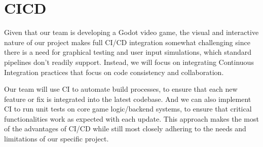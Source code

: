 \documentclass{article}
\begin{document}




\section{CICD}

Given that our team is developing a Godot video game, the visual and interactive nature of our project makes full CI/CD integration somewhat challenging since there is a need for graphical testing and user input simulations, which standard pipelines don’t readily support. Instead, we will focus on integrating Continuous Integration practices that focus on code consistency and collaboration.

Our team will use CI to automate build processes, to ensure that each new feature or fix is integrated into the latest codebase. And we can also implement CI to run unit tests on core game logic/backend systems, to ensure that critical functionalities work as expected with each update. This approach makes the most of the advantages of CI/CD while still most closely adhering to the needs and limitations of our specific project.
\end{document}
